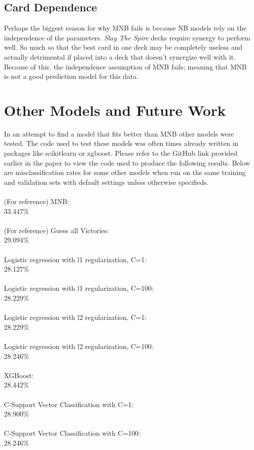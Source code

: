 \documentclass[10pt, a4paper, twocolumn]{article}
\begin{document}
\subsection{Card Dependence}
Perhaps the biggest reason for why MNB fails is because NB models rely on the independence of the parameters.  \textit{Slay The Spire} decks require synergy to perform well.  So much so that the best card in one deck may be completely useless and actually detrimental if placed into a deck that doesn’t synergize well with it.  Because of this, the independence assumption of MNB fails; meaning that MNB is not a good prediction model for this data.
\section{Other Models and Future Work}

In an attempt to find a model that fits better than MNB other models were tested.  The code used to test these models was often times already written in packages like scikitlearn or xgboost.  Please refer to the GitHub link provided earlier in the paper to view the code used to produce the following results.  Below are misclassification rates for some other models when run on the same training and validation sets with default settings unless otherwise specifieds.\\\\
(For reference) MNB: \\33.447\%\\\\
(For reference) Guess all Victories: \\29.094\%\\\\
Logistic regression with l1 regularization, C=1: \\28.127\%\\\\
Logistic regression with l1 regularization, C=100: \\28.229\%\\\\
Logistic regression with l2 regularization, C=1: \\28.229\%\\\\
Logistic regression with l2 regularization, C=100:\\ 28.246\%\\\\
XGBoost:\\28.442\%\\\\
C-Support Vector Classification with C=1: \\28.900\%\\\\
C-Support Vector Classification with C=100: \\28.246\%\\\\


\end{document}
